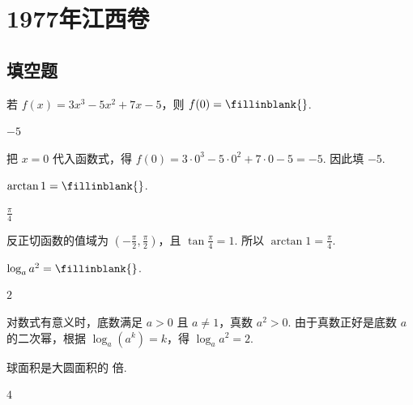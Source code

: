 \chapter{1977年江西卷}

\section{填空题}

\begin{problem}
若 \( f(x)=3x^3-5x^2+7x-5 \)，则 \( f(0)=\fillinblank{} \).
\end{problem}

\begin{answer}
\(-5\)
\end{answer}

\begin{solution}
把 \(x=0\) 代入函数式，得 \(f(0)=3\cdot0^3-5\cdot0^2+7\cdot0-5=-5\). 因此填 \(-5\).
\end{solution}

\begin{problem}
\(\arctan 1=\fillinblank{}\).
\end{problem}

\begin{answer}
\(\frac{\pi}{4}\)
\end{answer}

\begin{solution}
反正切函数的值域为 \(\left(-\frac{\pi}{2},\frac{\pi}{2}\right)\)，且 \(\tan\frac{\pi}{4}=1\). 所以 \(\arctan1=\frac{\pi}{4}\).
\end{solution}

\begin{problem}
\(\log_a a^2=\fillinblank{}\).
\end{problem}

\begin{answer}
\(2\)
\end{answer}

\begin{solution}
对数式有意义时，底数满足 \(a>0\) 且 \(a\ne1\)，真数 \(a^2>0\). 由于真数正好是底数 \(a\) 的二次幂，根据 \(\log_a\left(a^k\right)=k\)，得 \(\log_a a^2=2\).
\end{solution}

\begin{problem}
球面积是大圆面积的\fillinblank{} 倍.
\end{problem}

\begin{answer}
\(4\)
\end{answer}

